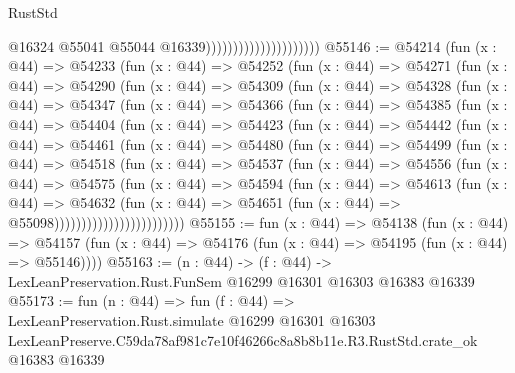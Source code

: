 \begin{lexlean}{RustStd}
\begin{coremodule}
                                              @16324
                                              @55041
                                              @55044
                                              @16339)))))))))))))))))))))
@55146 := @54214
    (fun (x : @44) =>
    @54233
      (fun (x : @44) =>
      @54252
        (fun (x : @44) =>
        @54271
          (fun (x : @44) =>
          @54290
            (fun (x : @44) =>
            @54309
              (fun (x : @44) =>
              @54328
                (fun (x : @44) =>
                @54347
                  (fun (x : @44) =>
                  @54366
                    (fun (x : @44) =>
                    @54385
                      (fun (x : @44) =>
                      @54404
                        (fun (x : @44) =>
                        @54423
                          (fun (x : @44) =>
                          @54442
                            (fun (x : @44) =>
                            @54461
                              (fun (x : @44) =>
                              @54480
                                (fun (x : @44) =>
                                @54499
                                  (fun (x : @44) =>
                                  @54518
                                    (fun (x : @44) =>
                                    @54537
                                      (fun (x : @44) =>
                                      @54556
                                        (fun (x : @44) =>
                                        @54575
                                          (fun (x : @44) =>
                                          @54594
                                            (fun (x : @44) =>
                                            @54613
                                              (fun (x : @44) =>
                                              @54632
                                                (fun (x : @44) =>
                                                @54651
                                                  (fun (x : @44) => @55098))))))))))))))))))))))))
@55155 := fun (x : @44) =>
  @54138
    (fun (x : @44) =>
    @54157 (fun (x : @44) => @54176 (fun (x : @44) => @54195 (fun (x : @44) => @55146))))
@55163 := (n : @44) ->
  (f : @44) -> LexLeanPreservation.Rust.FunSem @16299 @16301 @16303 @16383 @16339
@55173 := fun (n : @44) =>
  fun (f : @44) =>
  LexLeanPreservation.Rust.simulate
    @16299
    @16301
    @16303
    LexLeanPreserve.C59da78af981c7e10f46266c8a8b8b11e.R3.RustStd.crate_ok
    @16383
    @16339
\end{coremodule}
\end{lexlean}
